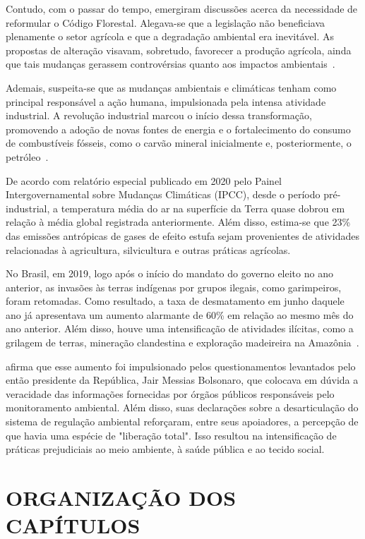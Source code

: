     Contudo, com o passar do tempo, emergiram discussões acerca da necessidade de reformular o Código Florestal. 
    Alegava-se que a legislação não beneficiava plenamente o setor agrícola e que a degradação ambiental era inevitável. 
    As propostas de alteração visavam, sobretudo, favorecer a produção agrícola, ainda que tais mudanças gerassem 
    controvérsias quanto aos impactos ambientais~\cite{Araujo_Boaventura_Silva2022}.
    
    Ademais, suspeita-se que as mudanças ambientais e climáticas tenham como principal responsável a ação humana, 
    impulsionada pela intensa atividade industrial. A revolução industrial marcou o início dessa transformação, 
    promovendo a adoção de novas fontes de energia e o fortalecimento do consumo de combustíveis fósseis, como o carvão 
    mineral inicialmente e, posteriormente, o petróleo~\cite{mendoncca2006aquecimento}.
    
    De acordo com relatório especial publicado em 2020 pelo Painel Intergovernamental sobre Mudanças Climáticas (IPCC), 
    desde o período pré-industrial, a temperatura média do ar na superfície da Terra quase dobrou em relação à média 
    global registrada anteriormente. Além disso, estima-se que 23\% das emissões antrópicas de gases de efeito estufa 
    sejam provenientes de atividades relacionadas à agricultura, silvicultura e outras práticas agrícolas.

    No Brasil, em 2019, logo após o início do mandato do governo eleito no ano anterior, as invasões às terras 
    indígenas por grupos ilegais, como garimpeiros, foram retomadas. Como resultado, a taxa de desmatamento em 
    junho daquele ano já apresentava um aumento alarmante de 60\% em relação ao mesmo mês do ano anterior. 
    Além disso, houve uma intensificação de atividades ilícitas, como a grilagem de terras, mineração clandestina 
    e exploração madeireira na Amazônia~\cite{barretto2020}.

     afirma que esse aumento foi impulsionado pelos questionamentos levantados pelo então 
    presidente da República, Jair Messias Bolsonaro, que colocava em dúvida a veracidade das informações fornecidas 
    por órgãos públicos responsáveis pelo monitoramento ambiental. Além disso, suas declarações sobre a desarticulação do sistema de 
    regulação ambiental reforçaram, entre seus apoiadores, a percepção de que havia uma espécie de "liberação total".
    Isso resultou na intensificação de práticas prejudiciais ao meio ambiente, à saúde pública e ao tecido social.



\section{ORGANIZAÇÃO DOS CAPÍTULOS}
